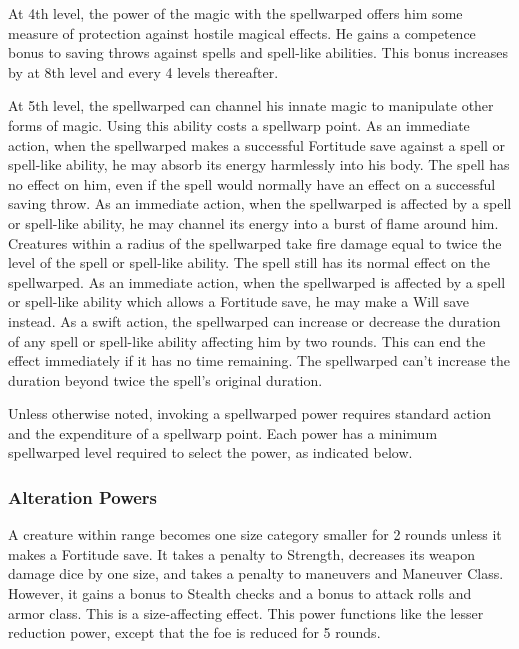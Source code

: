  At 4th level, the power of the magic with the spellwarped offers him some measure of protection against hostile magical effects. He gains a  competence bonus to saving throws against spells and spell-like abilities. This bonus increases by  at 8th level and every 4 levels thereafter.

 At 5th level, the spellwarped can channel his innate magic to manipulate other forms of magic. Using this ability costs a spellwarp point. 
 As an immediate action, when the spellwarped makes a successful Fortitude save against a spell or spell-like ability, he may absorb its energy harmlessly into his body. The spell has no effect on him, even if the spell would normally have an effect on a successful saving throw.
 As an immediate action, when the spellwarped is affected by a spell or spell-like ability, he may channel its energy into a burst of flame around him. Creatures within a \areasmall radius of the spellwarped take fire damage equal to twice the level of the spell or spell-like ability. The spell still has its normal effect on the spellwarped.
 As an immediate action, when the spellwarped is affected by a spell or spell-like ability which allows a Fortitude save, he may make a Will save instead.
 As a swift action, the spellwarped can increase or decrease the duration of any spell or spell-like ability affecting him by two rounds. This can end the effect immediately if it has no time remaining. The spellwarped can't increase the duration beyond twice the spell's original duration.

Unless otherwise noted, invoking a spellwarped power requires standard action and the expenditure of a spellwarp point. Each power has a minimum spellwarped level required to select the power, as indicated below.

\subsubsection{Alteration Powers}
 A creature within \rngclose range becomes one size category smaller for 2 rounds unless it makes a Fortitude save. It takes a  penalty to Strength, decreases its weapon damage dice by one size, and takes a  penalty to maneuvers and Maneuver Class. However, it gains a  bonus to Stealth checks and a  bonus to attack rolls and armor class. This is a size-affecting effect.
 This power functions like the lesser reduction power, except that the foe is reduced for 5 rounds.

